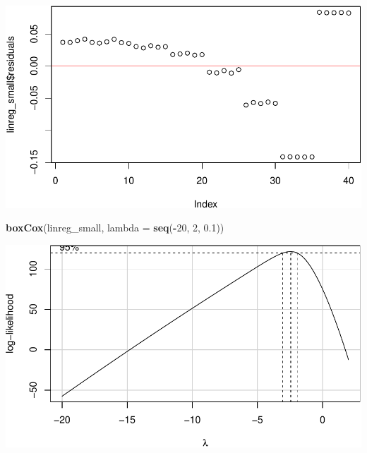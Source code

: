 \documentclass[
]{article}
\newenvironment{Shaded}{\begin{snugshade}}{\end{snugshade}}
\newcommand{\DataTypeTok}[1]{\textcolor[rgb]{0.13,0.29,0.53}{#1}}
\newcommand{\DecValTok}[1]{\textcolor[rgb]{0.00,0.00,0.81}{#1}}
\newcommand{\FloatTok}[1]{\textcolor[rgb]{0.00,0.00,0.81}{#1}}
\newcommand{\KeywordTok}[1]{\textcolor[rgb]{0.13,0.29,0.53}{\textbf{#1}}}
\newcommand{\NormalTok}[1]{#1}
\newcommand{\OperatorTok}[1]{\textcolor[rgb]{0.81,0.36,0.00}{\textbf{#1}}}
\newcommand{\StringTok}[1]{\textcolor[rgb]{0.31,0.60,0.02}{#1}}
\begin{document}
\includegraphics{main_files/figure-latex/unnamed-chunk-14-1.pdf}

\begin{Shaded}
\begin{Highlighting}[]
\KeywordTok{boxCox}\NormalTok{(linreg\_small, }\DataTypeTok{lambda =} \KeywordTok{seq}\NormalTok{(}\OperatorTok{{-}}\DecValTok{20}\NormalTok{, }\DecValTok{2}\NormalTok{, }\FloatTok{0.1}\NormalTok{))}
\end{Highlighting}
\end{Shaded}

\includegraphics{main_files/figure-latex/unnamed-chunk-14-2.pdf}

\begin{Shaded}
\end{Shaded}
\end{document}

